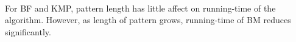 \begin{homeworkProblem}
{\paragraph{} For BF and KMP, pattern length has little affect on running-time of the algorithm. However, as length of pattern grows, running-time of BM reduces significantly.
}
\end{homeworkProblem}





